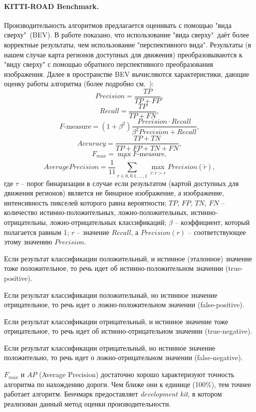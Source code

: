 \documentclass[oneside,final,12pt]{scrartcl}
\begin{document}
	 		\paragraph{KITTI-ROAD Benchmark.}
	 		Производительность алгоритмов предлагается оценивать с помощью "вида сверху"\ (BEV). В работе \cite{Fritsch2013} показано, что использование "вида сверху"\ даёт более корректные результаты, чем использование "перспективного вида". Результаты (в нашем случае карта регионов доступных для движения) преобразовываются к "виду сверху" с помощью обратного перспективного преобразования изображения.
	 		Далее в пространстве BEV вычисляются характеристики, дающие оценку работы алгоритма (более подробно см.~\cite{Fritsch2013}):
	 		\[ Precision = \frac{TP}{TP+FP}, \]
	 		\[ Recall = \frac{TP}{TP+FN}, \]
	 		\[ F\text{-measure} = \left( 1+\beta^{2} \right)\frac{Precision \cdot Recall}{\beta^{2} Precision + Recall}, \]
	 		\[ Accuracy = \frac{TP+TN}{TP+FP+TN+FN}, \]
	 		\[ F_{max} = \max_{\tau} F\text{-measure}, \]
	 		\[ Average Precision = \frac{1}{11} \sum_{r \in 0, 0.1, \dots, 1} \max_{\widetilde{r}:\widetilde{r}>r} Precision(\widetilde{r}), \]
	 		где \(\tau\) -- порог бинаризации в случае если результатом (картой доступных для движения регионов) является не бинарное изображение, а изображение, интенсивность пикселей которого равна вероятности; \(TP\), \(FP\), \(TN\), \(FN\) -- количество истинно-положительных, ложно-положительных, истинно-отрицательны, ложно-отрицательных классификаций; \(\beta\) -- коэффициент, который полагается равным 1; \(r\) -- значение \(Recall\), а \(Precision(r)\) -- соответствующее этому значению \(Precision\).

	 		Если результат классификации положительный, и истинное (эталонное) значение тоже положительное, то речь идет об истинно-положительном значении (true-positive).

	 		Если результат классификации положительный, но истинное значение отрицательное, то речь идет о ложно-положительном значении (false-positive).

	 		Если результат классификации отрицательный, и истинное значение тоже отрицательное, то речь идет об истинно-отрицательном значении (true-negative).

	 		Если результат классификации отрицательный, но истинное значение положительно, то речь идет о ложно-отрицательном значении (false-negative).

	 		\(F_{max}\) и \(AP\) (Average Precision) достаточно хорошо характеризуют точность алгоритма по нахождению дороги. Чем ближе они к единице (100\%), тем точнее работает алгоритм.
	 		Бенчмарк предоставляет \textit{development kit}, в котором реализован данный метод оценки производительности.
\end{document}
